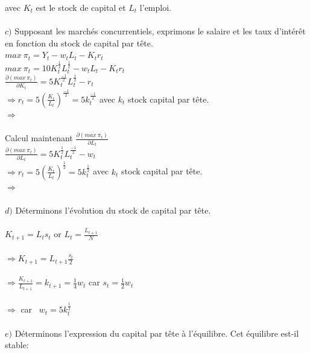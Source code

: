 \documentclass[11pt,twoside,a4paper]{article}
\begin{document}
 avec $K_t$ est le stock de capital et $L_t$ l'emploi.\\ \\
 $c)$ Supposant les marchés concurrentiels, exprimons le salaire et les taux d'intér\^{e}t en fonction du stock de capital par t\^{e}te.\\

$ max\ \pi_t= Y_t -w_tL_t-K_t r_t $\\

 $ max\ \pi_t=10K_t^{\frac{1}{2}}L_t^{\frac{1}{2}}-w_tL_t-K_t r_t $\\
 
 $
  \frac{\partial (max\ \pi_t)}{\partial K_t}=5K_t^{\frac{-1}{2}}L_t^{\frac{1}{2}}-r_t $\\
 
$ \Rightarrow r_t= 5(\frac{K_t}{L_t})^{\frac{-1}{2}}=5k_t^{\frac{-1}{2}}$ \: avec $k_t$ stock capital par t\^{e}te.\\


 $ \Rightarrow$   \\
 \\Calcul maintenant $\frac{\partial (max\ \pi_t)}{\partial L_t}$\\
 
 $\frac{\partial (max\ \pi_t)}{\partial L_t}=5K_t^{\frac{1}{2}}L_t^{\frac{-1}{2}}-w_t$\\
 
 $ \Rightarrow r_t= 5(\frac{K_t}{L_t})^{\frac{1}{2}}=5k_t^{\frac{1}{2}}$ \: avec $k_t$ stock capital par t\^{e}te.\\

$ \Rightarrow$   \\ \\
$d)$ Déterminons l'évolution du stock de capital par tête.\\\\
$K_{t+1}=L_t s_t$ \: or \: $L_t=\frac{L_{t+1}}{N}$\\\\
$\Rightarrow  K_{t+1}=L_{t+1}\frac{s_t}{2}$\\\\
$\Rightarrow \frac{K_{t+1}}{L_{t+1}}=k_{t+1}=\frac{1}{4}w_t$ \: car $s_t = \frac{1}{2} w_t $\\\\
$ \Rightarrow$   \: car \ $w_t = 5k_t^{\frac{1}{2}} $\\\\
$e)$ Déterminons l'expression du capital par tête à l'équilibre. Cet équilibre
est-il stable:\\\\
\end{document}

